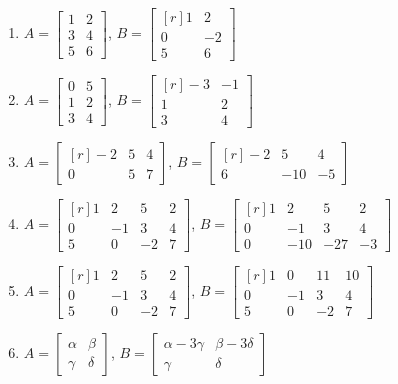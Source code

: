\begin{enumerate}[start=150]
    \item $A=\begin{bmatrix*}1 & 2 \\ 3 & 4 \\ 5 & 6\end{bmatrix*}$, $B=\begin{bmatrix*}[r]1 & 2 \\ 0 & -2 \\ 5 & 6\end{bmatrix*}$
    \item $A=\begin{bmatrix*}0 & 5 \\ 1 & 2 \\ 3 & 4\end{bmatrix*}$, $B=\begin{bmatrix*}[r]-3 & -1 \\ 1 & 2 \\ 3 & 4\end{bmatrix*}$
    \item $A=\begin{bmatrix*}[r]-2 & 5 & 4 \\ 0 & 5 & 7\end{bmatrix*}$, $B=\begin{bmatrix*}[r]-2 & 5 & 4 \\ 6 & -10 & -5\end{bmatrix*}$
    \item $A=\begin{bmatrix*}[r]1 & 2 & 5 & 2 \\ 0 & -1 & 3 & 4 \\ 5 & 0 & -2 & 7\end{bmatrix*}$, $B=\begin{bmatrix*}[r]1 & 2 & 5 & 2 \\ 0 & -1 & 3 & 4 \\ 0 & -10 & -27 & -3\end{bmatrix*}$
    \item $A=\begin{bmatrix*}[r]1 & 2 & 5 & 2 \\ 0 & -1 & 3 & 4 \\ 5 & 0 & -2 & 7\end{bmatrix*}$, $B=\begin{bmatrix*}[r]1 & 0 & 11 & 10 \\ 0 & -1 & 3 & 4 \\ 5 & 0 & -2 & 7\end{bmatrix*}$
    \item $A=\begin{bmatrix*}\alpha & \beta \\ \gamma & \delta\end{bmatrix*}$, $B=\begin{bmatrix*}\alpha-3 \gamma & \beta-3 \delta \\ \gamma & \delta\end{bmatrix*}$

\end{enumerate}

